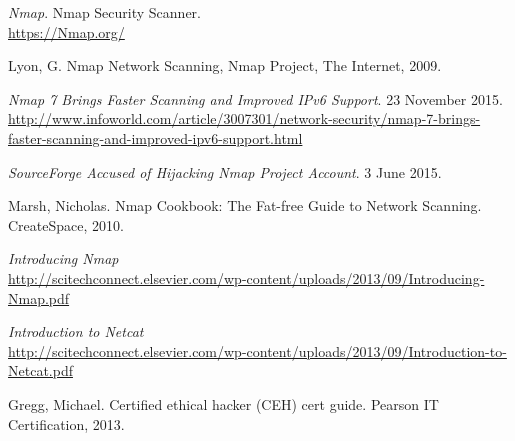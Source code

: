 \documentclass[12pt]{extarticle}
\begin{document}
\begin{thebibliography}{9}

	\textit{Nmap}. Nmap Security Scanner. \\
	\url{https://Nmap.org/}


Lyon, G. Nmap Network Scanning,
Nmap Project, The Internet, 2009.

\textit{Nmap 7 Brings Faster Scanning and Improved IPv6 Support}. 23 November 2015.\\
\url{http://www.infoworld.com/article/3007301/network-security/nmap-7-brings-faster-scanning-and-improved-ipv6-support.html}

\textit{SourceForge Accused of Hijacking Nmap Project Account}. 3 June 2015.\\


Marsh, Nicholas. Nmap Cookbook: The Fat-free Guide to Network Scanning. CreateSpace, 2010.
    
\textit{Introducing Nmap}\\
\url{http://scitechconnect.elsevier.com/wp-content/uploads/2013/09/Introducing-Nmap.pdf}

\textit{Introduction to Netcat}\\
\url{http://scitechconnect.elsevier.com/wp-content/uploads/2013/09/Introduction-to-Netcat.pdf}


Gregg, Michael. Certified ethical hacker (CEH) cert guide. Pearson IT Certification, 2013.

\end{thebibliography}
\end{document}
